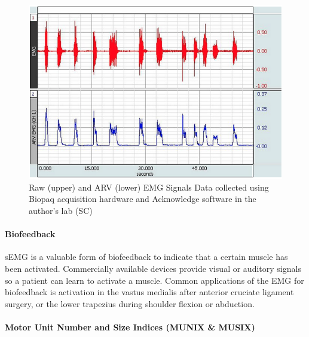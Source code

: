 \begin{figure}[!ht]
    \centering
    \includegraphics[width=1\linewidth]{./figure/EMG_ARV.png}
    \caption{Raw (upper) and ARV (lower) EMG Signals \footnotesize{Data collected using Biopaq acquisition hardware and Acknowledge software in the author's lab (SC)}}
    \label{fig:EMG_ARV}
\end{figure}

\paragraph{Biofeedback}

sEMG is a valuable form of biofeedback to indicate that a certain muscle has been activated. Commercially available devices provide visual or auditory signals so a patient can learn to activate a muscle. Common applications of the EMG for biofeedback is activation in the vastus medialis after anterior cruciate ligament surgery, or the lower trapezius during shoulder flexion or abduction.

\paragraph{Motor Unit Number and Size Indices (MUNIX \& MUSIX)}

